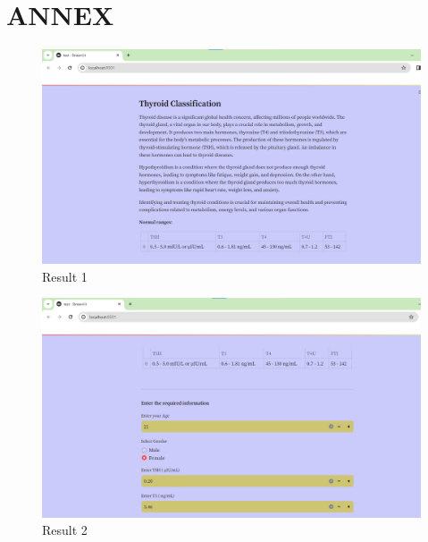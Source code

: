 


\renewcommand{\bibname}{REFERENCES} %


 \chapter*{ANNEX}
 
\begin{figure}[ht]
\centering
\includegraphics[scale=0.4]{result1.png}
\caption{Result 1}
\end{figure}

\begin{figure}[h]
\centering
\includegraphics[scale=0.4]{result2.png}
\caption{Result 2}
\end{figure}

